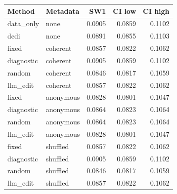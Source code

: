\begingroup\setlength{\tabcolsep}{3pt}\small
\begin{tabular}{llrrr}
\toprule
Method & Metadata & SW1 & CI low & CI high \\
\midrule
data\_only & none & 0.0905 & 0.0859 & 0.1102 \\
dcdi & none & 0.0891 & 0.0855 & 0.1103 \\
fixed & coherent & 0.0857 & 0.0822 & 0.1062 \\
diagnostic & coherent & 0.0905 & 0.0859 & 0.1102 \\
random & coherent & 0.0846 & 0.0817 & 0.1059 \\
llm\_edit & coherent & 0.0857 & 0.0822 & 0.1062 \\
fixed & anonymous & 0.0828 & 0.0801 & 0.1047 \\
diagnostic & anonymous & 0.0864 & 0.0823 & 0.1064 \\
random & anonymous & 0.0864 & 0.0823 & 0.1064 \\
llm\_edit & anonymous & 0.0828 & 0.0801 & 0.1047 \\
fixed & shuffled & 0.0857 & 0.0822 & 0.1062 \\
diagnostic & shuffled & 0.0905 & 0.0859 & 0.1102 \\
random & shuffled & 0.0846 & 0.0817 & 0.1059 \\
llm\_edit & shuffled & 0.0857 & 0.0822 & 0.1062 \\
\bottomrule
\end{tabular}
\endgroup
